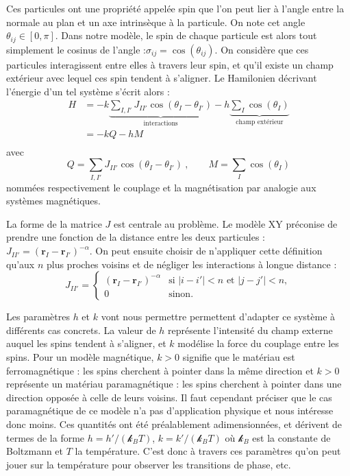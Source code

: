 \documentclass[a4paper, 11pt]{article}
\newcommand{\vr}{\bm{r}}
\newcommand{\kb}{\mathcal{k}_B}
\begin{document}
Ces particules ont une propriété appelée spin que l'on peut lier à l'angle entre la normale au plan
et un axe intrinsèque à la particule. On note cet angle $\theta_{ij} \in [0, \pi]$. Dans notre
modèle, le spin de chaque particule est alors tout simplement le cosinus de l'angle :$\sigma_{ij} =
\cos(\theta_{ij})$.  On considère que ces particules interagissent entre elles à travers leur spin,
et qu'il existe un champ extérieur avec lequel ces spin tendent à s'aligner. Le Hamilonien décrivant
l'énergie d'un tel système s'écrit alors : 
\begin{equation}
    \begin{aligned}  
        H &= - k \underbrace{\sum_{I, I'} J_{II'} \cos(\theta_I-\theta_{I'})}_{\text{interactions}} 
        - h \underbrace{\sum_I \cos(\theta_I) }_{\text{champ extérieur}} \\
          &= -k Q - h M \\
    \end{aligned}
\end{equation}
avec
\begin{equation}
    Q = \sum_{I, I'} J_{II'} \cos(\theta_I-\theta_{I'})~, \qquad M = \sum_I \cos(\theta_I) 
\end{equation}
nommées respectivement le couplage et la magnétisation par analogie aux systèmes magnétiques.

La forme de la matrice $J$ est centrale au problème. Le modèle XY préconise de prendre une fonction
de la distance entre les deux particules : $J_{II'} = (\vr_I - \vr_{I'})^{-\alpha}$. On peut ensuite
choisir de n'appliquer cette définition qu'aux $n$ plus proches voisins et de négliger les
interactions à longue distance : 
\begin{equation}
    J_{II'} = 
    \begin{cases}
        (\vr_I - \vr_{I'})^{-\alpha} & \text{si~} |i-i'|<n \text{~et~} |j-j'|<n, \\
        0 & \text{sinon.}
    \end{cases}
\end{equation}

Les paramètres $h$ et $k$ vont nous permettre permettent d'adapter ce système à différents cas
concrets. La valeur de $h$ représente l'intensité du champ externe auquel les spins tendent à
s'aligner, et $k$ modélise la force du couplage entre les spins. Pour un modèle magnétique, $k>0$
signifie que le matériau est ferromagnétique : les spins cherchent à pointer dans la même direction
et $k>0$ représente un matériau paramagnétique : les spins cherchent à pointer dans une direction
opposée à celle de leurs voisins. Il faut cependant préciser que le cas paramagnétique de ce modèle
n'a pas d'application physique et nous intéresse donc moins. Ces quantités ont été préalablement
adimensionnées, et dérivent de termes de la forme $h=h'/(\kb T)$, $k = k'/(\kb T)$ où $\kb$ est la
constante de Boltzmann et $T$ la température. C'est donc à travers ces paramètres qu'on peut jouer
sur la température pour observer les transitions de phase, etc. 
\end{document}
